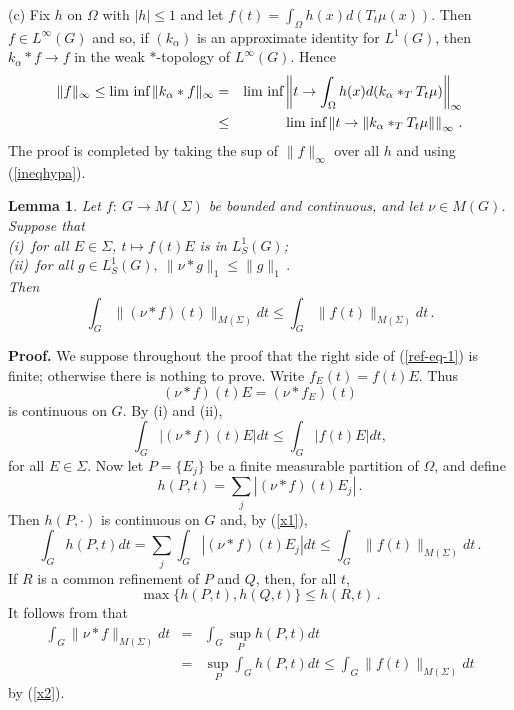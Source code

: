 \documentclass[12pt]{article}
\renewcommand{\liminf}{\mathop{\hbox{\rm lim inf}}\limits}
\newtheorem{lemma}[defin]{Lemma}
\begin{document}
\noindent
(c)  Fix $h$ on $\Omega$ with $|h|\leq 1$ and let $f(t)=\int_\Omega
h(x)d(T_t\mu(x))$.  Then $f\in L^\infty(G)$ and so, if $(k_\alpha)$ is an approximate
identity for $L^1(G)$, then 
$k_\alpha *f\rightarrow f$ in the weak $*$-topology of $L^\infty(G)$.  Hence
\begin{eqnarray*}
\|f\|_\infty\leq \liminf\|k_\alpha *f\|_\infty&=&
\liminf\left\|t\rightarrow \int_\Omega h(x)d(k_\alpha*_T T_t\mu) \right\|_\infty\\
&\leq &
\liminf\left\|t\rightarrow \|k_\alpha*_T T_t\mu\| \right\|_\infty\,.
\end{eqnarray*}
The proof is completed by taking the sup of $\|f\|_\infty$ 
over all $h$ and using (\ref{ineqhypa}).





\begin{lemma}
Let $f:\ G\rightarrow M(\Sigma)$ be bounded and continuous, and let $\nu\in M(G)$.  
Suppose that\\
(i)\ for all $E\in\Sigma$, $t\mapsto f(t)E$ is in $L^1_S(G)$;\\
(ii)\ for all $g\in L^1_S(G),\ \|\nu*g\|_1\leq \|g\|_1\,.$\\
Then 
\begin{equation}
 \int_G\|(\nu*f)(t)\|_{M(\Sigma)}dt\leq \int_G
\|f (t)\|_{M(\Sigma)}dt\,.
\label{ref-eq-1}
\end{equation} 
\label{ref2}
\end{lemma}
{\bf Proof.}  We suppose throughout the proof that 
the right side of (\ref{ref-eq-1}) is finite; otherwise there is nothing to prove.
Write $f_E(t)=f(t)E$.  Thus
$$(\nu*f)(t)E=(\nu*f_E)(t)$$
is continuous on $G$.  By (i) and (ii),
\begin{equation}
\int_G|(\nu*f)(t)E|dt\leq \int_G|f(t)E|dt,
\label{x1}
\end{equation}
for all $E\in\Sigma$.  Now let $P=\{E_j\}$ be a finite measurable partition of 
$\Omega$, and define 
$$h(P,t)= \sum_j|(\nu*f)(t)E_j|\,.$$
Then $h(P,\cdot)$ is continuous on $G$ and, by (\ref{x1}),
\begin{equation}
\int_G h(P,t)dt=\sum_j\int_G|(\nu*f)(t)E_j|dt
\leq \int_G\|f(t)\|_{M(\Sigma)}dt\,.
\label{x2}
\end{equation}
If $R$ is a common refinement of $P$ and $Q$, then, for all $t$,
$$\max\{h(P,t),h(Q,t)\}\leq h(R,t)\,.$$
It follows from \cite[(11.13)]{hr1} that
\begin{eqnarray*}
\int_G\|\nu*f\|_{M(\Sigma)}dt&=&\int_G \sup_Ph(P,t)dt\\
&=&\sup_P\int_G h(P,t)dt \leq \int_G\|f(t)\|_{M(\Sigma)}dt
\end{eqnarray*}
by (\ref{x2}). \\
\end{document}
